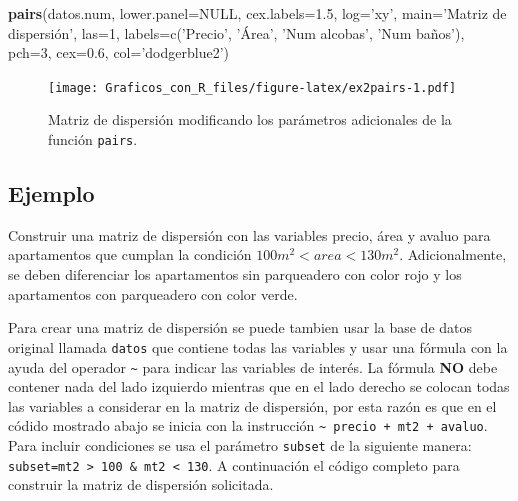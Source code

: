 \documentclass[10pt,]{krantz}
\makeatletter
\newenvironment{Shaded}{\begin{snugshade}}{\end{snugshade}}
\newcommand{\KeywordTok}[1]{\textcolor[rgb]{0.13,0.29,0.53}{\textbf{#1}}}
\newcommand{\DataTypeTok}[1]{\textcolor[rgb]{0.13,0.29,0.53}{#1}}
\newcommand{\FloatTok}[1]{\textcolor[rgb]{0.00,0.00,0.81}{#1}}
\newcommand{\StringTok}[1]{\textcolor[rgb]{0.31,0.60,0.02}{#1}}
\newcommand{\OtherTok}[1]{\textcolor[rgb]{0.56,0.35,0.01}{#1}}
\newcommand{\NormalTok}[1]{#1}
\newenvironment{kframe}{%
\medskip{}
\setlength{\fboxsep}{.8em}
 \def\at@end@of@kframe{}%
 \ifinner\ifhmode%
  \def\at@end@of@kframe{\end{minipage}}%
  \begin{minipage}{\columnwidth}%
 \fi\fi%
 \def\FrameCommand##1{\hskip\@totalleftmargin \hskip-\fboxsep
 \colorbox{shadecolor}{##1}\hskip-\fboxsep
     \hskip-\linewidth \hskip-\@totalleftmargin \hskip\columnwidth}%
 \MakeFramed {\advance\hsize-\width
   \@totalleftmargin\z@ \linewidth\hsize
   \@setminipage}}%
 {\par\unskip\endMakeFramed%
 \at@end@of@kframe}
\renewenvironment{Shaded}{\begin{kframe}}{\end{kframe}}
\makeatother
\begin{document}
\begin{Shaded}
\begin{Highlighting}[]
\KeywordTok{pairs}\NormalTok{(datos.num, }\DataTypeTok{lower.panel=}\OtherTok{NULL}\NormalTok{, }\DataTypeTok{cex.labels=}\FloatTok{1.5}\NormalTok{, }\DataTypeTok{log=}\StringTok{'xy'}\NormalTok{,}
      \DataTypeTok{main=}\StringTok{'Matriz de dispersión', las=1,}
\StringTok{      labels=c('}\NormalTok{Precio}\StringTok{', '}\NormalTok{Área}\StringTok{', '}\NormalTok{Num alcobas}\StringTok{', '}\NormalTok{Num baños}\StringTok{'),}
\StringTok{      pch=3, cex=0.6, col='}\NormalTok{dodgerblue2}\StringTok{')}
\end{Highlighting}
\end{Shaded}

\begin{figure}
\centering
\texttt{[image: Graficos\_con\_R\_files/figure-latex/ex2pairs-1.pdf]}
\caption{\label{fig:ex2pairs}Matriz de dispersión modificando los parámetros
adicionales de la función \texttt{pairs}.}
\end{figure}

\subsection*{Ejemplo}\label{ejemplo-16}


Construir una matriz de dispersión con las variables precio, área y
avaluo para apartamentos que cumplan la condición
\(100 m^2 < area < 130 m^2\). Adicionalmente, se deben diferenciar los
apartamentos sin parqueadero con color rojo y los apartamentos con
parqueadero con color verde.

Para crear una matriz de dispersión se puede tambien usar la base de
datos original llamada \texttt{datos} que contiene todas las variables y
usar una fórmula con la ayuda del operador \texttt{\textasciitilde{}}
para indicar las variables de interés. La fórmula \textbf{NO} debe
contener nada del lado izquierdo mientras que en el lado derecho se
colocan todas las variables a considerar en la matriz de dispersión, por
esta razón es que en el códido mostrado abajo se inicia con la
instrucción \texttt{\textasciitilde{}\ precio\ +\ mt2\ +\ avaluo}. Para
incluir condiciones se usa el parámetro \texttt{subset} de la siguiente
manera:
\texttt{subset=mt2\ \textgreater{}\ 100\ \&\ mt2\ \textless{}\ 130}. A
continuación el código completo para construir la matriz de dispersión
solicitada.
\end{document}
